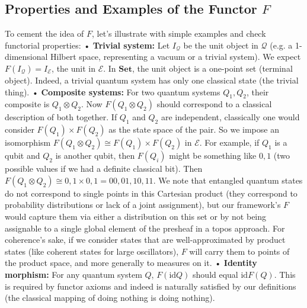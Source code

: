 \subsection{Properties and Examples of the Functor $F$}
To cement the idea of $F$, let’s illustrate with simple examples and check functorial properties:
	•	\textbf{Trivial system:} Let $I_{\mathcal{Q}}$ be the unit object in $\mathcal{Q}$ (e.g. a 1-dimensional Hilbert space, representing a vacuum or a trivial system). We expect $F(I_{\mathcal{Q}}) = I_{\mathcal{E}}$, the unit in $\mathcal{E}$. In $\mathbf{Set}$, the unit object is a one-point set (terminal object). Indeed, a trivial quantum system has only one classical state (the trivial thing).
	•	\textbf{Composite systems:} For two quantum systems $Q_1, Q_2$, their composite is $Q_1 \otimes Q_2$. Now $F(Q_1 \otimes Q_2)$ should correspond to a classical description of both together. If $Q_1$ and $Q_2$ are independent, classically one would consider $F(Q_1) \times F(Q_2)$ as the state space of the pair. So we impose an isomorphism $F(Q_1 \otimes Q_2) \cong F(Q_1)\times F(Q_2)$ in $\mathcal{E}$. For example, if $Q_1$ is a qubit and $Q_2$ is another qubit, then $F(Q_i)$ might be something like ${0,1}$ (two possible values if we had a definite classical bit). Then $F(Q_1\otimes Q_2) \cong {0,1} \times {0,1} = {00, 01, 10, 11}$. We note that entangled quantum states do not correspond to single points in this Cartesian product (they correspond to probability distributions or lack of a joint assignment), but our framework’s $F$ would capture them via either a distribution on this set or by not being assignable to a single global element of the presheaf in a topos approach. For coherence’s sake, if we consider states that are well-approximated by product states (like coherent states for large oscillators), $F$ will carry them to points of the product space, and more generally to measures on it.
	•	\textbf{Identity morphism:} For any quantum system $Q$, $F(\mathrm{id}Q)$ should equal $\mathrm{id}{F(Q)}$. This is required by functor axioms and indeed is naturally satisfied by our definitions (the classical mapping of doing nothing is doing nothing).
